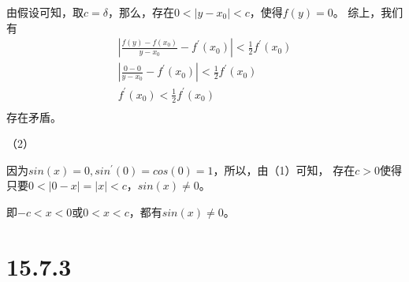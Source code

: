 \documentclass{article}
\begin{document}
由假设可知，取$c = \delta$，那么，存在$0 < |y - x_0| < c$，使得$f(y) = 0$。
综上，我们有
\begin{align*}
  \left|\frac{f(y) - f(x_0)}{y - x_0} - f^\prime(x_0)\right| < \frac{1}{2} f^\prime(x_0) \\
  \left|\frac{0 - 0}{y - x_0} - f^\prime(x_0)\right| < \frac{1}{2} f^\prime(x_0)         \\
  f^\prime(x_0) < \frac{1}{2} f^\prime(x_0)                                              \\
\end{align*}
存在矛盾。

（2）

因为$sin(x) = 0, sin^\prime(0) = cos(0) = 1$，所以，由（1）可知，
存在$c > 0$使得只要$0 < |0 - x| = |x| < c$，$sin(x) \neq 0$。

即$-c < x < 0$或$0 < x < c$，都有$sin(x) \neq 0$。

\section*{15.7.3}
\end{document}
